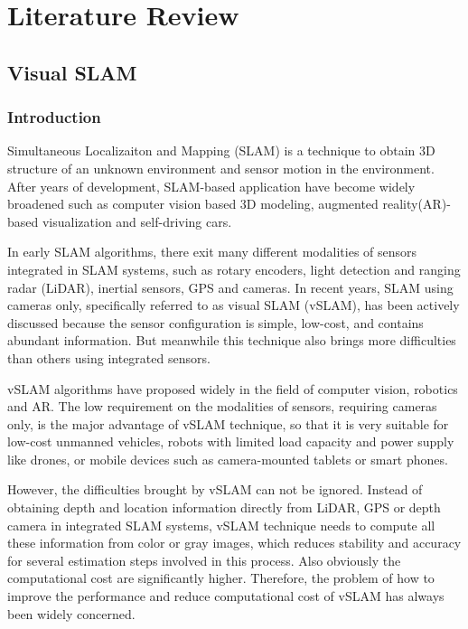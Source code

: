
\chapter{Literature Review}

\section{Visual SLAM}

\subsection{Introduction}
Simultaneous Localizaiton and Mapping (SLAM) is a technique to obtain 3D structure of an unknown environment and sensor motion in the environment. After years of development, SLAM-based application have become widely broadened such as computer vision based 3D modeling, augmented reality(AR)-based visualization and self-driving cars. 

In early SLAM algorithms, there exit many different modalities of sensors integrated in SLAM systems, such as rotary encoders, light detection and ranging radar (LiDAR), inertial sensors, GPS and cameras. In recent years, SLAM using cameras only,  specifically referred to as visual SLAM (vSLAM), has been actively discussed because the sensor configuration is simple, low-cost, and contains abundant information. But meanwhile this technique also brings more difficulties than others using integrated sensors\cite{taketomi2017visual}. 

vSLAM algorithms have proposed widely in the field of computer vision, robotics and AR. The low requirement on the modalities of sensors, requiring cameras only, is the major advantage of vSLAM technique, so that it is very suitable for low-cost unmanned vehicles, robots with limited load capacity and power supply like drones, or mobile devices such as camera-mounted tablets or smart phones.

However, the difficulties brought by vSLAM can not be ignored. Instead of obtaining depth and location information directly from LiDAR, GPS or depth camera in integrated SLAM systems, vSLAM technique needs to compute all these information from color or gray images, which reduces stability and accuracy for several estimation steps involved in this process. Also obviously the computational cost are significantly higher. Therefore, the problem of how to improve the performance and reduce computational cost of vSLAM has always been widely concerned.


